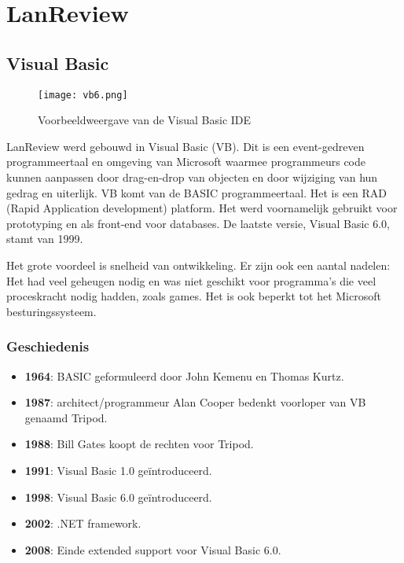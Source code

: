 \section{LanReview}

\subsection{Visual Basic}

\begin{figure}[h!]
    \texttt{[image: vb6.png]}
    \caption{Voorbeeldweergave van de Visual Basic IDE \autocite{Speed2020}}
    \label{fig:vb6ide}
\end{figure}

LanReview werd gebouwd in Visual Basic (VB). Dit is een event-gedreven programmeertaal en omgeving van Microsoft waarmee programmeurs code kunnen aanpassen door drag-en-drop van objecten en door wijziging van hun gedrag en uiterlijk. VB komt van de BASIC programmeertaal. Het is een RAD (Rapid Application development) platform. Het werd voornamelijk gebruikt voor prototyping en als front-end voor databases. De laatste versie, Visual Basic 6.0, stamt van 1999.

Het grote voordeel is snelheid van ontwikkeling. Er zijn ook een aantal nadelen:
Het had veel geheugen nodig en was niet geschikt voor programma's die veel proceskracht nodig hadden, zoals games. Het is ook beperkt tot het Microsoft besturingssysteem.

\autocite{Rouse2019}

\subsubsection{Geschiedenis}

\begin{itemize}
    \item \textbf{1964}: BASIC geformuleerd door John Kemenu en Thomas Kurtz.
    \item \textbf{1987}: architect/programmeur Alan Cooper bedenkt voorloper van VB genaamd Tripod.
    \item \textbf{1988}: Bill Gates koopt de rechten voor Tripod.
    \item \textbf{1991}: Visual Basic 1.0 geïntroduceerd.
    \item \textbf{1998}: Visual Basic 6.0 geïntroduceerd.
    \item \textbf{2002}: .NET framework.
    \item \textbf{2008}: Einde extended support voor Visual Basic 6.0.
\end{itemize} \autocite{Grigonis2014}

